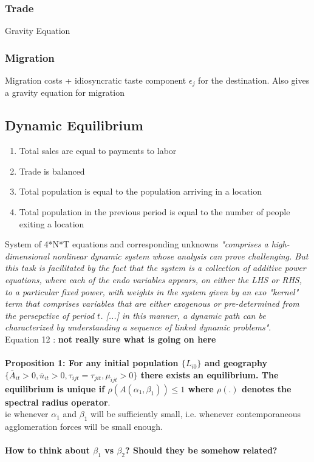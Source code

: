 \documentclass[10pt, final]{article}
\begin{document}
\subsubsection{Trade} %
\label{ssub:trade}
Gravity Equation

\subsubsection{Migration} %
\label{ssub:migration}

Migration costs + idiosyncratic taste component $\epsilon_j$ for the destination. Also gives a gravity equation for migration

\subsection{Dynamic Equilibrium} %
\label{sub:dynamic_equilibrium}

\begin{enumerate}
    \item Total sales are equal to payments to labor
    \item Trade is balanced
    \item Total population is equal to the population arriving in a location
    \item Total population in the previous period is equal to the number of people exiting a location
\end{enumerate}
System of 4*N*T equations and corresponding unknowns \textit{"comprises a high-dimensional nonlinear dynamic system whose analysis can prove challenging. But this task is facilitated by the fact that the system is a collection of additive power equations, where each of the endo variables appears, on either the LHS or RHS, to a particular fixed power, with weights in the system given by an exo "kernel" term that comprises variables that are either exogenous or pre-determined from the persepctive of period $t$. [...] in this manner, a dynamic path can be characterized by understanding a sequence of linked dynamic problems"}.
\\
Equation 12 : \textbf{not really sure what is going on here}
\\
\\
\textbf{Proposition 1: For any initial population $\{L_{i0}\}$ and geography $\{\bar{A}_{it} > 0, \bar{u}_{it} > 0, \tau_{ijt} = \tau_{jit}, \mu_{ijt} > 0\}$ there exists an equilibrium. The equilibrium is unique if $\rho(A(\alpha_1, \beta_1)) \leq 1$ where $\rho(.)$ denotes the spectral radius operator}. \\ 
ie whenever $\alpha_1$ and $\beta_1$ will be sufficiently small, i.e. whenever contemporaneous agglomeration forces will be small enough.
\\
\\
\textbf{How to think about $\beta_1$ vs $\beta_2$? Should they be somehow related?}
\end{document}
